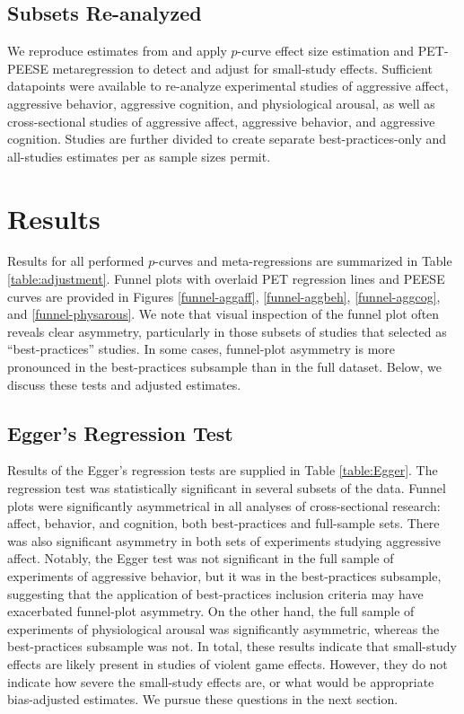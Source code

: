 \documentclass[man]{apa6}
\begin{document}
\subsection{Subsets Re-analyzed}
We reproduce estimates from \citet{Anderson:etal:2010} and apply $p$-curve effect size estimation and PET-PEESE metaregression to detect and adjust for small-study effects. Sufficient datapoints were available to re-analyze experimental studies of aggressive affect, aggressive behavior, aggressive cognition, and physiological arousal, as well as cross-sectional studies of aggressive affect, aggressive behavior, and aggressive cognition. Studies are further divided to create separate best-practices-only and all-studies estimates per \citet{Anderson:etal:2010} as sample sizes permit. 

\section{Results}
Results for all performed $p$-curves and meta-regressions are summarized in Table \ref{table:adjustment}. 
Funnel plots with overlaid PET regression lines and PEESE curves are provided in Figures \ref{funnel-aggaff}, \ref{funnel-aggbeh}, \ref{funnel-aggcog}, and \ref{funnel-physarous}. We note that visual inspection of the funnel plot often reveals clear asymmetry, particularly in those subsets of studies that \citet{Anderson:etal:2010} selected as ``best-practices'' studies. In some cases, funnel-plot asymmetry is more pronounced in the best-practices subsample than in the full dataset. 
Below, we discuss these tests and adjusted estimates.%

\subsection{Egger's Regression Test}
Results of the Egger's regression tests are supplied in Table \ref{table:Egger}. 
The regression test was statistically significant in several subsets of the data. Funnel plots were significantly asymmetrical in all analyses of cross-sectional research: affect, behavior, and cognition, both best-practices and full-sample sets. There was also significant asymmetry in both sets of experiments studying aggressive affect.
Notably, the Egger test was not significant in the full sample of experiments of aggressive behavior, but it was in the best-practices subsample, suggesting that the application of best-practices inclusion criteria may have exacerbated funnel-plot asymmetry. On the other hand, the full sample of experiments of physiological arousal was significantly asymmetric, whereas the best-practices subsample was not.
In total, these results indicate that small-study effects are likely present in studies of violent game effects. However, they do not indicate how severe the small-study effects are, or what would be appropriate bias-adjusted estimates. We pursue these questions in the next section.
\end{document}
